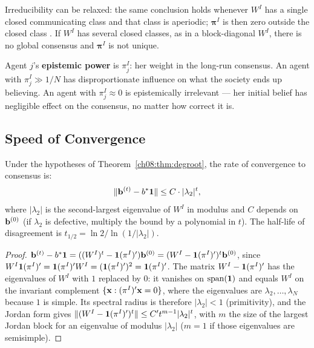 \documentclass[../structural_economics_book.tex]{subfiles}
\begin{document}
Irreducibility can be relaxed: the same conclusion holds whenever $W^I$ has a single closed communicating class and that class is aperiodic; $\boldsymbol{\pi}^I$ is then zero outside the closed class \citep{golub2010naive}. If $W^I$ has several closed classes, as in a block-diagonal $W^I$, there is no global consensus and $\boldsymbol{\pi}^I$ is not unique.

\begin{definition}\label{ch08:def:epistemic_power}
Agent $j$'s \textbf{epistemic power} is $\pi^I_j$: her weight in the long-run consensus. An agent with $\pi^I_j \gg 1/N$ has disproportionate influence on what the society ends up believing. An agent with $\pi^I_j \approx 0$ is epistemically irrelevant --- her initial belief has negligible effect on the consensus, no matter how correct it is.
\end{definition}


\subsection{Speed of Convergence}

\begin{proposition}\label{ch08:prop:rate}
Under the hypotheses of Theorem~\ref{ch08:thm:degroot}, the rate of convergence to consensus is:
\begin{equation}\label{ch08:eq:rate}
\|\mathbf{b}^{(t)} - b^*\mathbf{1}\| \leq C \cdot |\lambda_2|^t,
\end{equation}
where $|\lambda_2|$ is the second-largest eigenvalue of $W^I$ in modulus and $C$ depends on $\mathbf{b}^{(0)}$ (if $\lambda_2$ is defective, multiply the bound by a polynomial in $t$). The half-life of disagreement is $t_{1/2} = \ln 2 / \ln(1/|\lambda_2|)$.
\end{proposition}

\begin{proof}
$\mathbf{b}^{(t)} - b^*\mathbf{1} = ((W^I)^t - \mathbf{1}(\pi^I)')\mathbf{b}^{(0)} = (W^I - \mathbf{1}(\pi^I)')^t\mathbf{b}^{(0)}$, since $W^I\mathbf{1}(\pi^I)' = \mathbf{1}(\pi^I)'W^I = (\mathbf{1}(\pi^I)')^2 = \mathbf{1}(\pi^I)'$. The matrix $W^I - \mathbf{1}(\pi^I)'$ has the eigenvalues of $W^I$ with $1$ replaced by $0$: it vanishes on $\operatorname{span}(\mathbf{1})$ and equals $W^I$ on the invariant complement $\{\mathbf{x} : (\pi^I)'\mathbf{x} = 0\}$, where the eigenvalues are $\lambda_2, \ldots, \lambda_N$ because $1$ is simple. Its spectral radius is therefore $|\lambda_2| < 1$ (primitivity), and the Jordan form gives $\|(W^I - \mathbf{1}(\pi^I)')^t\| \leq C' t^{m-1}|\lambda_2|^t$, with $m$ the size of the largest Jordan block for an eigenvalue of modulus $|\lambda_2|$ ($m = 1$ if those eigenvalues are semisimple).
\end{proof}
\end{document}
